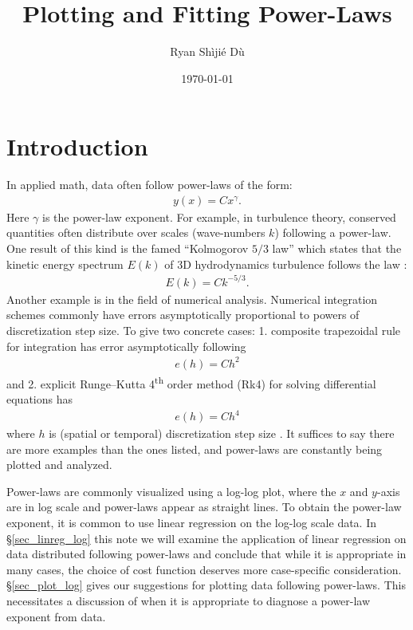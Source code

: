 \documentclass[11pt,letterpaper]{article}
\title{Plotting and Fitting Power-Laws}
\author{Ryan Sh\`iji\'e D\`u}
\date{\today}
\begin{document}

\maketitle

\section{Introduction}
In applied math, data often follow power-laws of the form:
\begin{align}
    y(x) = Cx^\gamma.
\end{align}
Here $\gamma$ is the power-law exponent. For example, in turbulence theory, conserved quantities often distribute over scales (wave-numbers $k$) following a power-law. One result of this kind is the famed ``Kolmogorov $5/3$ law'' which states that the kinetic energy spectrum $E(k)$ of 3D hydrodynamics turbulence follows the law \parencite{Frisch_95}:
\begin{align}
    E(k) = Ck^{-5/3}.
\end{align}
Another example is in the field of numerical analysis. Numerical integration schemes commonly have errors asymptotically proportional to powers of discretization step size. To give two concrete cases: 1. composite trapezoidal rule for integration has error asymptotically following
\begin{align}
    e(h) = Ch^{2}
\end{align}
and 2. explicit Runge–Kutta 4\textsuperscript{th} order method (Rk4) for solving differential equations has
\begin{align}
    e(h) = Ch^{4}
\end{align}
where $h$ is (spatial or temporal) discretization step size \parencite{SuliMayers_03}. It suffices to say there are more examples than the ones listed, and power-laws are constantly being plotted and analyzed.

Power-laws are commonly visualized using a log-log plot, where the $x$ and $y$-axis are in log scale and power-laws appear as straight lines. To obtain the power-law exponent, it is common to use linear regression on the log-log scale data. In \S\ref{sec_linreg_log} this note we will examine the application of linear regression on data distributed following power-laws and conclude that while it is appropriate in many cases, the choice of cost function deserves more case-specific consideration. \S\ref{sec_plot_log} gives our suggestions for plotting data following power-laws. This necessitates a discussion of when it is appropriate to diagnose a power-law exponent from data.
\end{document}
